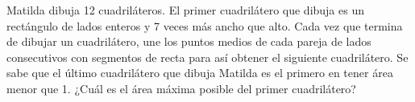 Matilda dibuja 12 cuadriláteros. El primer cuadrilátero que dibuja es un rectángulo de lados enteros y 7 veces más ancho que alto. Cada vez que termina de dibujar un cuadrilátero, une los puntos medios de cada pareja de lados consecutivos con segmentos de recta para así obtener el siguiente cuadrilátero. Se sabe que el último cuadrilátero que dibuja Matilda es el primero en tener área menor que 1. ¿Cuál es el área máxima posible del primer cuadrilátero?